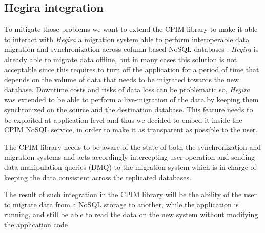 \subsection{Hegira integration}
To mitigate those problems we want to extend the CPIM library to make it able to interact with \textit{Hegira} a migration system able to perform interoperable data migration and synchronization across column-based NoSQL databases \cite{paper:modaclouds-deliverable}. \textit{Hegira} is already able to migrate data offline, but in many cases this solution is not acceptable since this requires to turn off the application for a period of time that depends on the volume of data that needs to be migrated towards the new database. 
Downtime costs and risks of data loss can be problematic so, \textit{Hegira} was extended to be able to perform a live-migration of the data by keeping them synchronized on the source and the destination database.
This feature needs to be exploited at application level and thus we decided to embed it inside the CPIM NoSQL service, in order to make it as transparent as possible to the user.

\noindent The CPIM library needs to be aware of the state of both the synchronization and migration systems and acts accordingly intercepting user operation and sending data manipulation queries (DMQ) to the migration system which is in charge of keeping the data consistent across the replicated databases.

\noindent The result of such integration in the CPIM library will be the ability of the user to migrate data from a NoSQL storage to another, while the application is running, and still be able to read the data on the new system without modifying the application code